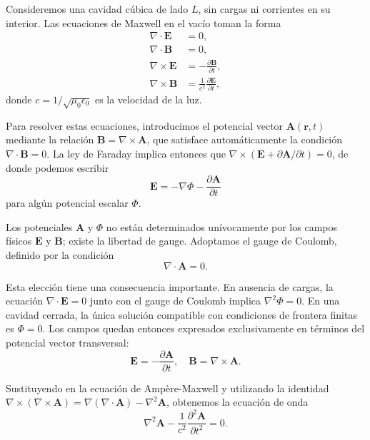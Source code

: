    Consideremos una cavidad cúbica de lado $L$, sin cargas ni corrientes en su interior. Las ecuaciones de Maxwell en el vacío toman la forma \cite{Jackson1999}
    \begin{align}
        \nabla \cdot \mathbf{E} &= 0, \\
        \nabla \cdot \mathbf{B} &= 0, \\
        \nabla \times \mathbf{E} &= -\frac{\partial \mathbf{B}}{\partial t}, \\
        \nabla \times \mathbf{B} &= \frac{1}{c^2}\frac{\partial \mathbf{E}}{\partial t},
    \end{align}
    donde $c = 1/\sqrt{\mu_0 \epsilon_0}$ es la velocidad de la luz.
    
    Para resolver estas ecuaciones, introducimos el potencial vector $\mathbf{A}(\mathbf{r}, t)$ mediante la relación $\mathbf{B} = \nabla \times \mathbf{A}$, que satisface automáticamente la condición $\nabla \cdot \mathbf{B} = 0$. La ley de Faraday implica entonces que $\nabla \times (\mathbf{E} + \partial\mathbf{A}/\partial t) = 0$, de donde podemos escribir
    \begin{equation}
        \mathbf{E} = -\nabla \Phi - \frac{\partial \mathbf{A}}{\partial t}
    \end{equation}
    para algún potencial escalar $\Phi$.
    
    Los potenciales $\mathbf{A}$ y $\Phi$ no están determinados unívocamente por los campos físicos $\mathbf{E}$ y $\mathbf{B}$; existe la libertad de gauge. Adoptamos el gauge de Coulomb, definido por la condición
    \begin{equation}
        \nabla \cdot \mathbf{A} = 0.
    \end{equation}
    
    Esta elección tiene una consecuencia importante. En ausencia de cargas, la ecuación $\nabla \cdot \mathbf{E} = 0$ junto con el gauge de Coulomb implica $\nabla^2 \Phi = 0$. En una cavidad cerrada, la única solución compatible con condiciones de frontera finitas es $\Phi = 0$. Los campos quedan entonces expresados exclusivamente en términos del potencial vector transversal:
    \begin{equation}
        \mathbf{E} = -\frac{\partial \mathbf{A}}{\partial t}, \quad \mathbf{B} = \nabla \times \mathbf{A}.
    \end{equation}
    
    Sustituyendo en la ecuación de Ampère-Maxwell y utilizando la identidad $\nabla \times (\nabla \times \mathbf{A}) = \nabla(\nabla \cdot \mathbf{A}) - \nabla^2 \mathbf{A}$, obtenemos la ecuación de onda
    \begin{equation}
        \nabla^2 \mathbf{A} - \frac{1}{c^2}\frac{\partial^2 \mathbf{A}}{\partial t^2} = 0.
    \end{equation}
    
